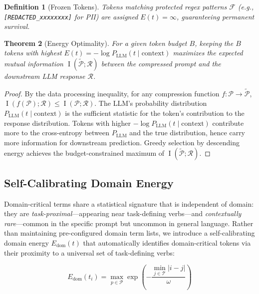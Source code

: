 \documentclass[11pt]{article}
\newtheorem{theorem}{Theorem}[section]
\newtheorem{definition}[theorem]{Definition}
\theoremstyle{remark}
\DeclareMathOperator{\MI}{I}
\begin{document}
\begin{definition}[Frozen Tokens]
\label{def:frozen}
Tokens matching protected regex patterns $\mathcal{F}$ (e.g.,
\texttt{[REDACTED\_xxxxxxxx]} for PII) are assigned
$E(t) = \infty$, guaranteeing permanent survival.
\end{definition}

\begin{theorem}[Energy Optimality]
\label{thm:optimality}
For a given token budget $B$, keeping the $B$ tokens with highest
$E(t) = -\log P_{\text{LLM}}(t \mid \text{context})$ maximizes the
expected mutual information $\MI(\tilde{\mathcal{P}}; \mathcal{R})$
between the compressed prompt and the downstream LLM response $\mathcal{R}$.
\end{theorem}

\begin{proof}
By the data processing inequality, for any compression function
$f: \mathcal{P} \to \tilde{\mathcal{P}}$,
$\MI(f(\mathcal{P}); \mathcal{R}) \leq \MI(\mathcal{P}; \mathcal{R})$.
The LLM's probability distribution $P_{\text{LLM}}(t \mid \text{context})$
is the sufficient statistic for the token's contribution to the response
distribution. Tokens with higher $-\log P_{\text{LLM}}(t \mid \text{context})$
contribute more to the cross-entropy between $P_{\text{LLM}}$ and the
true distribution, hence carry more information for downstream prediction.
Greedy selection by descending energy achieves the budget-constrained
maximum of $\MI(\tilde{\mathcal{P}}; \mathcal{R})$.
\end{proof}

\subsection{Self-Calibrating Domain Energy}
\label{sec:domain-energy}

Domain-critical terms share a statistical signature that is independent
of domain: they are \emph{task-proximal}---appearing near task-defining
verbs---and \emph{contextually rare}---common in the specific prompt but
uncommon in general language. Rather than maintaining pre-configured
domain term lists, we introduce a self-calibrating domain energy
$E_{\text{dom}}(t)$ that automatically identifies domain-critical tokens
via their proximity to a universal set of task-defining verbs:

\begin{equation}
    E_{\text{dom}}(t_i) = \max_{p \in \mathcal{P}} \exp\!\left(
        -\frac{\min_{j \in \mathcal{T}} |i - j|}{\omega}
    \right)
\end{equation}
\end{document}
